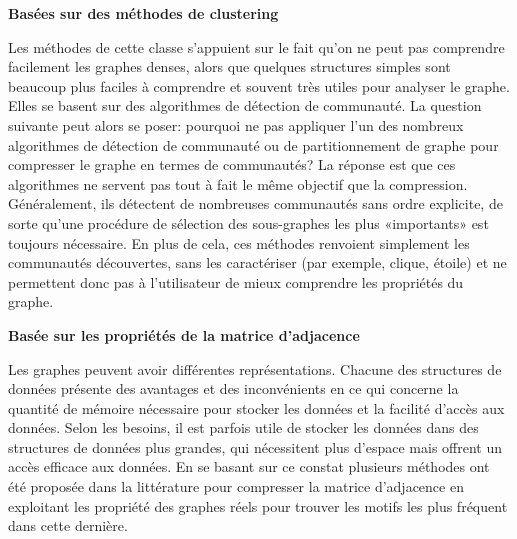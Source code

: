 \documentclass[a4paper,oneside,12pt]{report}
\theoremstyle{definition}
\begin{document}
					 \textbf{Basées sur des méthodes de clustering}
							
							Les méthodes de cette classe s'appuient sur le fait qu'on ne peut pas comprendre facilement les graphes denses, alors que quelques structures simples sont beaucoup plus faciles à comprendre et souvent très utiles pour analyser le graphe. Elles se basent sur des algorithmes de détection de communauté. 
							La question suivante peut alors se poser: pourquoi ne pas appliquer l'un des nombreux algorithmes de détection de communauté ou de partitionnement de graphe pour compresser le graphe en termes de communautés? La réponse est que ces algorithmes ne servent pas tout à fait le même objectif que la compression. Généralement, ils détectent de nombreuses communautés sans ordre explicite, de sorte qu'une procédure de sélection des sous-graphes les plus «importants» est toujours nécessaire. En plus de cela, ces méthodes renvoient simplement les communautés découvertes, sans les caractériser (par exemple, clique, étoile) et ne permettent donc pas à l'utilisateur de mieux comprendre les propriétés du graphe. 
							
							
							
							
							
							
			
					 \textbf{Basée sur les propriétés de la matrice d'adjacence}
							
							Les graphes peuvent avoir différentes représentations. Chacune des structures de données présente des avantages et des inconvénients en ce qui concerne la quantité de mémoire nécessaire pour stocker les données et la facilité d'accès aux données. Selon les besoins, il est parfois utile de stocker les données dans des structures de données plus grandes, qui nécessitent plus d'espace mais offrent un accès efficace aux données. En se basant sur ce constat plusieurs méthodes ont été  proposée dans la littérature pour compresser la matrice d'adjacence en exploitant les propriété des graphes réels pour trouver les motifs les plus fréquent dans cette dernière.
							
							
							
					
\end{document}
